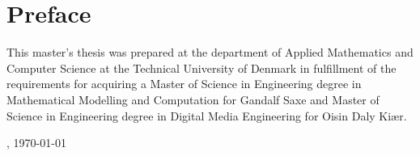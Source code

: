 \chapter{Preface}
This master's thesis was prepared at the department of Applied Mathematics and Computer Science at the Technical University of Denmark in fulfillment of the requirements for acquiring a Master of Science in Engineering degree in Mathematical Modelling and Computation for Gandalf Saxe and Master of Science in Engineering degree in Digital Media Engineering for Oisin Daly Kiær.

\vfill

{
\centering
    \thesislocation{}, \today\\[1cm]
    \vspace{5cm}
\begin{flushright}
    \thesisauthor{}
\end{flushright}
}
